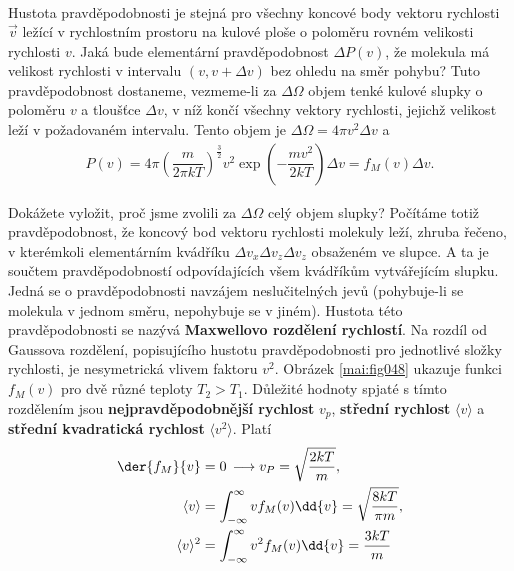 \begin{mdframed}[style=mdexam]
\begin{example}
\begin{align*}
    \end{align*}
    Hustota pravděpodobnosti je stejná pro všechny koncové body vektoru rychlosti \(\vec{v}\) ležící
    v rychlostním prostoru na kulové ploše o poloměru rovném velikosti rychlosti \(v\). Jaká bude
    elementární pravděpodobnost \(\Delta P(v)\), že molekula má velikost rychlosti v intervalu \((v,
    v + \Delta v)\) bez ohledu na směr pohybu? Tuto pravděpodobnost dostaneme, vezmeme-li za
    \(\Delta\Omega\) objem tenké kulové slupky o poloměru \(v\) a tloušťce \(\Delta v\), v níž končí
    všechny vektory rychlosti, jejichž velikost leží v požadovaném intervalu. Tento objem je
    \(\Delta\Omega = 4\pi v^2\Delta v\) a
    \begin{gather*}
      P(v) = 4\pi\left(\dfrac{m}{2\pi kT}\right)^{\frac{3}{2}}v^2
                \exp\left(- \dfrac{mv^2}{2 kT}\right)\Delta v = f_M(v)\Delta v. 
    \end{gather*}

    {\centering
      \captionsetup{type=figure}
    \par}
    
    Dokážete vyložit, proč jsme zvolili za \(\Delta\Omega\) celý objem slupky? Počítáme totiž
    pravděpodobnost, že koncový bod vektoru rychlosti molekuly leží, zhruba řečeno, v kterémkoli
    elementárním kvádříku \(\Delta v_x\Delta v_z\Delta v_z\) obsaženém ve slupce. A ta je součtem
    pravděpodobností odpovídajících všem kvádříkům vytvářejícím slupku. Jedná se o pravděpodobnosti
    navzájem neslučitelných jevů (pohybuje-li se molekula v jednom směru, nepohybuje se v jiném).
    Hustota této pravděpodobnosti se nazývá \textbf{Maxwellovo rozdělení rychlostí}. Na rozdíl od
    Gaussova rozdělení, popisujícího hustotu pravděpodobnosti pro jednotlivé složky rychlosti, je
    nesymetrická vlivem faktoru \(v^2\). Obrázek \ref{mai:fig048} ukazuje funkci \(f_M(v)\) pro dvě
    různé teploty \(T_2 > T_1\). Důležité hodnoty spjaté s tímto rozdělením jsou
    \textbf{nejpravděpodobnější rychlost} \(v_p\), \textbf{střední rychlost} \(\langle v \rangle\) a
    \textbf{střední kvadratická rychlost} \(\langle v^2 \rangle\). Platí
    \begin{align*}
      \der{f_M}{v}        &= 0\, \longrightarrow v_P = \sqrt{\dfrac{2kT}{m}},                    \\
      \langle v \rangle   &= \int_{-\infty}^{\infty}vf_M(v)\dd{v} = \sqrt{\dfrac{8kT}{\pi m}},   \\
      \langle v \rangle^2 &= \int_{-\infty}^{\infty}v^2f_M(v)\dd{v} = \dfrac{3kT}{m}
    \end{align*}
  \end{example}
\end{mdframed}